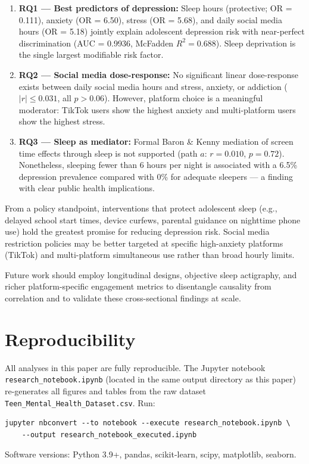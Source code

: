\documentclass[11pt]{article}
\begin{document}
\begin{enumerate}
\item \textbf{RQ1 — Best predictors of depression:}  Sleep hours (protective; OR = 0.111),
anxiety (OR = 6.50), stress (OR = 5.68), and daily social media hours (OR = 5.18) jointly
explain adolescent depression risk with near-perfect discrimination (AUC = 0.9936,
McFadden $R^2 = 0.688$).  Sleep deprivation is the single largest modifiable risk factor.

\item \textbf{RQ2 — Social media dose-response:}  No significant linear dose-response exists
between daily social media hours and stress, anxiety, or addiction ($|r| \leq 0.031$,
all $p > 0.06$).  However, platform choice is a meaningful moderator: TikTok users show
the highest anxiety and multi-platform users show the highest stress.

\item \textbf{RQ3 — Sleep as mediator:}  Formal Baron \& Kenny mediation of screen time
effects through sleep is not supported (path $a$: $r = 0.010$, $p = 0.72$).  Nonetheless,
sleeping fewer than 6 hours per night is associated with a 6.5\% depression prevalence
compared with 0\% for adequate sleepers --- a finding with clear public health implications.
\end{enumerate}

From a policy standpoint, interventions that protect adolescent sleep (e.g., delayed school
start times, device curfews, parental guidance on nighttime phone use) hold the greatest
promise for reducing depression risk.  Social media restriction policies may be better
targeted at specific high-anxiety platforms (TikTok) and multi-platform simultaneous use
rather than broad hourly limits.

Future work should employ longitudinal designs, objective sleep actigraphy, and richer
platform-specific engagement metrics to disentangle causality from correlation and to
validate these cross-sectional findings at scale.

\section*{Reproducibility}

All analyses in this paper are fully reproducible.  The Jupyter notebook
\texttt{research\_notebook.ipynb} (located in the same output directory as this paper)
re-generates all figures and tables from the raw dataset
\texttt{Teen\_Mental\_Health\_Dataset.csv}.  Run:

\begin{verbatim}
jupyter nbconvert --to notebook --execute research_notebook.ipynb \
    --output research_notebook_executed.ipynb
\end{verbatim}

Software versions: Python 3.9+, pandas, scikit-learn, scipy, matplotlib, seaborn.
\end{document}
